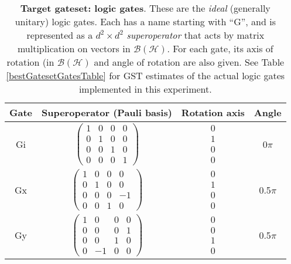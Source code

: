 \documentclass{article}[11pt]
\begin{document}
\begin{table}[h]
\begin{center}
\begin{tabular}[l]{|c|c|c|c|}
\hline
Gate & Superoperator (Pauli basis) & Rotation axis & Angle \\ \hline
Gi & $ \left(\!\!\begin{array}{cccc}
1 & 0 & 0 & 0 \\ 
0 & 1 & 0 & 0 \\ 
0 & 0 & 1 & 0 \\ 
0 & 0 & 0 & 1
 \end{array}\!\!\right) $
 & $ \begin{array}{c}
0 \\ 
1 \\ 
0 \\ 
0
 \end{array} $
 & 0$\pi$ \\ \hline
Gx & $ \left(\!\!\begin{array}{cccc}
1 & 0 & 0 & 0 \\ 
0 & 1 & 0 & 0 \\ 
0 & 0 & 0 & -1 \\ 
0 & 0 & 1 & 0
 \end{array}\!\!\right) $
 & $ \begin{array}{c}
0 \\ 
1 \\ 
0 \\ 
0
 \end{array} $
 & 0.5$\pi$ \\ \hline
Gy & $ \left(\!\!\begin{array}{cccc}
1 & 0 & 0 & 0 \\ 
0 & 0 & 0 & 1 \\ 
0 & 0 & 1 & 0 \\ 
0 & -1 & 0 & 0
 \end{array}\!\!\right) $
 & $ \begin{array}{c}
0 \\ 
0 \\ 
1 \\ 
0
 \end{array} $
 & 0.5$\pi$ \\ \hline
\end{tabular}

\caption{\textbf{Target gateset: logic gates}.  These are the \emph{ideal} (generally unitary) logic gates.  Each has a name starting with ``G'', and is represented as a $d^2\times d^2$ \emph{superoperator} that acts by matrix multiplication on vectors in $\mathcal{B}(\mathcal{H})$.  For each gate, its axis of rotation (in $\mathcal{B}(\mathcal{H})$ and angle of rotation are also given.  See Table \ref{bestGatesetGatesTable} for GST estimates of the actual logic gates implemented in this experiment.\label{targetGatesTable}}
\end{center}
\end{table}
\end{document}
